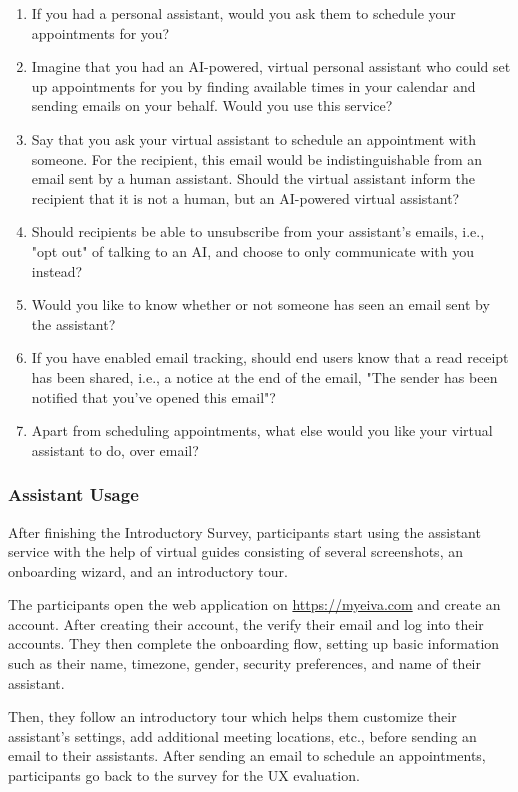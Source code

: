 \documentclass{article}
\begin{document}
\begin{enumerate}[resume]
	\item If you had a personal assistant, would you ask them to schedule your appointments for you?
	\item Imagine that you had an AI-powered, virtual personal assistant who could set up appointments for you by finding available times in your calendar and sending emails on your behalf. Would you use this service?
	\item Say that you ask your virtual assistant to schedule an appointment with someone. For the recipient, this email would be indistinguishable from an email sent by a human assistant. Should the virtual assistant inform the recipient that it is not a human, but an AI-powered virtual assistant?
	\item Should recipients be able to unsubscribe from your assistant's emails, i.e., "opt out" of talking to an AI, and choose to only communicate with you instead?
	\item Would you like to know whether or not someone has seen an email sent by the assistant?
	\item If you have enabled email tracking, should end users know that a read receipt has been shared, i.e., a notice at the end of the email, "The sender has been notified that you've opened this email"?
	\item Apart from scheduling appointments, what else would you like your virtual assistant to do, over email?
\end{enumerate}

\subsubsection{Assistant Usage}

After finishing the Introductory Survey, participants start using the assistant service with the help of virtual guides consisting of several screenshots, an onboarding wizard, and an introductory tour.

The participants open the web application on \url{https://myeiva.com} and create an account. After creating their account, the verify their email and log into their accounts. They then complete the onboarding flow, setting up basic information such as their name, timezone, gender, security preferences, and name of their assistant.

Then, they follow an introductory tour which helps them customize their assistant's settings, add additional meeting locations, etc., before sending an email to their assistants. After sending an email to schedule an appointments, participants go back to the survey for the UX evaluation.
\end{document}

